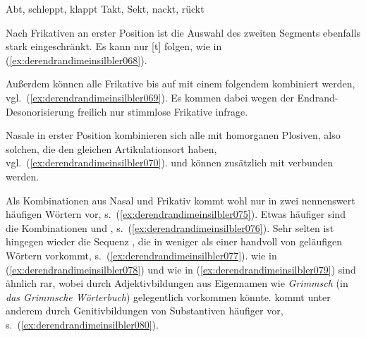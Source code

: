 \begin{exe}
  \ex\label{ex:derendrandimeinsilbler067}
  \begin{xlist}
    \ex Abt, schleppt, klappt
    \ex Takt, Sekt, nackt, rückt
  \end{xlist}
\end{exe}

Nach Frikativen an erster Position ist die Auswahl des zweiten Segments ebenfalls stark eingeschränkt.
Es kann nur [t] folgen, wie in (\ref{ex:derendrandimeinsilbler068}).

\begin{exe}
\end{exe}

Außerdem können alle Frikative bis auf \textipa{[s]} mit einem folgendem \textipa{[s]} kombiniert werden, vgl.\ (\ref{ex:derendrandimeinsilbler069}).
Es kommen dabei wegen der Endrand-Desonorisierung freilich nur stimmlose Frikative infrage.

\begin{exe}
\end{exe}

Nasale in erster Position kombinieren sich alle mit homorganen Plosiven, also solchen, die den gleichen Artikulationsort haben, vgl.\ (\ref{ex:derendrandimeinsilbler070}).
\textipa{[m]} und \textipa{[N]} können zusätzlich mit \textipa{[t]} verbunden werden.

\begin{exe}
  \ex\label{ex:derendrandimeinsilbler070}
  \begin{xlist}
  \end{xlist}
\end{exe}

Als Kombinationen aus Nasal und Frikativ kommt \textipa{[n\c{c}]} wohl nur in zwei nennenswert häufigen Wörtern vor, s.\ (\ref{ex:derendrandimeinsilbler075}).
Etwas häufiger sind die Kombinationen \textipa{[nf]} und \textipa{[ns]}, s.\ (\ref{ex:derendrandimeinsilbler076}).
Sehr selten ist hingegen wieder die Sequenz \textipa{[nS]}, die in weniger als einer handvoll von geläufigen Wörtern vorkommt, s.\ (\ref{ex:derendrandimeinsilbler077}).
\textipa{[ms]} wie in (\ref{ex:derendrandimeinsilbler078}) und \textipa{[mS]} wie in (\ref{ex:derendrandimeinsilbler079}) sind ähnlich rar, wobei \textipa{[mS]} durch Adjektivbildungen aus Eigennamen wie \textit{Grimmsch} (in \textit{das Grimmsche Wörterbuch}) gelegentlich vorkommen könnte.
\textipa{[Ns]} kommt unter anderem durch Genitivbildungen von Substantiven häufiger vor, s.\ (\ref{ex:derendrandimeinsilbler080}).

